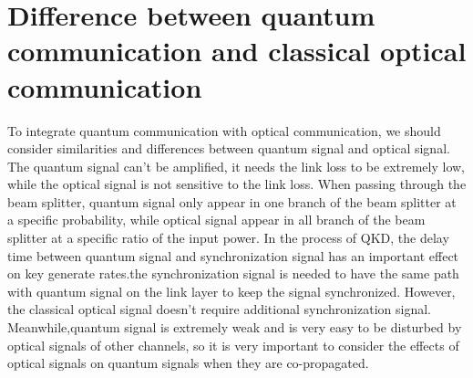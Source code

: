 \documentclass[letterpaper,10pt]{article}
\begin{document}
\section{Difference between quantum communication and classical optical communication}
To integrate quantum communication with optical communication, we should consider similarities and differences between quantum signal and optical signal. The quantum signal can't be amplified, it needs the link loss to be extremely low, while the optical signal is not sensitive to the link loss. When passing through the beam splitter, quantum signal only appear in one branch of the beam splitter at a specific probability, while optical signal appear in all branch of the beam splitter at a specific ratio of the input power. In the process of QKD, the delay time between quantum signal and synchronization signal has an important effect on key generate rates.the synchronization signal is needed to have the same path with quantum signal on the link layer to keep the signal synchronized. However, the classical optical signal doesn't require additional synchronization signal. Meanwhile,quantum signal is extremely weak and is very easy to be disturbed by optical signals of other channels, so it is very important to consider the effects of optical signals on quantum signals when they are co-propagated. 
\end{document}
